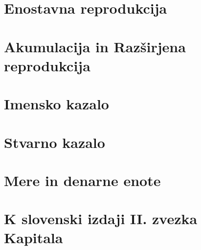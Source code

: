 \documentclass[egregdoesnotlikesansseriftitles, a5paper, DIV=calc]{scrbook}
\begin{document}
    \chapter{Enostavna reprodukcija}

    \chapter{Akumulacija in Razširjena reprodukcija}

\chapter{Imensko kazalo}

\chapter{Stvarno kazalo}

\chapter{Mere in denarne enote}

\chapter{K slovenski izdaji II. zvezka Kapitala}
\end{document}
